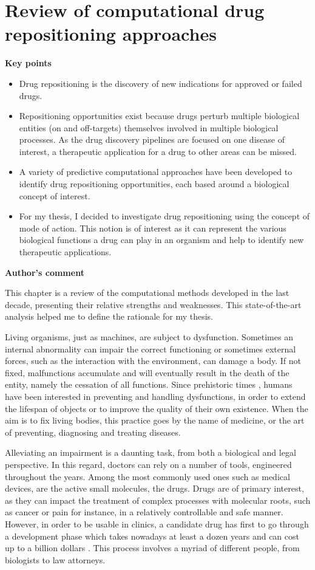\chapter{Review of computational drug repositioning approaches}

\textbf{Key points}
\begin{itemize}
  \item Drug repositioning is the discovery of new indications for approved or failed drugs.
  \item Repositioning opportunities exist because drugs perturb multiple biological entities (on and off-targets) themselves involved in multiple biological processes. As the drug discovery pipelines are focused on one disease of interest, a therapeutic application for a drug to other areas can be missed.
  \item A variety of predictive computational approaches have been developed to identify drug repositioning opportunities, each based around a biological concept of interest.
  \item For my thesis, I decided to investigate drug repositioning using the concept of mode of action. This notion is of interest as it can represent the various biological functions a drug can play in an organism and help to identify new therapeutic applications.
\end{itemize}

\textbf{Author’s comment}

This chapter is a review of the computational methods developed in the last decade, presenting their relative strengths and weaknesses. This state-of-the-art analysis helped me to define the rationale for my thesis.

\hrulefill

Living organisms, just as machines, are subject to dysfunction. Sometimes an internal abnormality can impair the correct functioning or sometimes external forces, such as the interaction with the environment, can damage a body. If not fixed, malfunctions accumulate and will eventually result in the death of the entity, namely the cessation of all functions. Since prehistoric times \citep{prehistoricwiki}, humans have been interested in preventing and handling dysfunctions, in order to extend the lifespan of objects or to improve the quality of their own existence. When the aim is to fix living bodies, this practice goes by the name of medicine, or the art of preventing, diagnosing and treating diseases.

Alleviating an impairment is a daunting task, from both a biological and legal perspective. In this regard, doctors can rely on a number of tools, engineered throughout the years. Among the most commonly used ones such as medical devices, are the active small molecules, the drugs. Drugs are of primary interest, as they can impact the treatment of complex processes with molecular roots, such as cancer or pain for instance, in a relatively controllable and safe manner. However, in order to be usable in clinics, a candidate drug has first to go through a development phase which takes nowadays at least a dozen years and can cost up to a billion dollars \citep{dimasi2001new}. This process involves a myriad of different people, from biologists to law attorneys.

